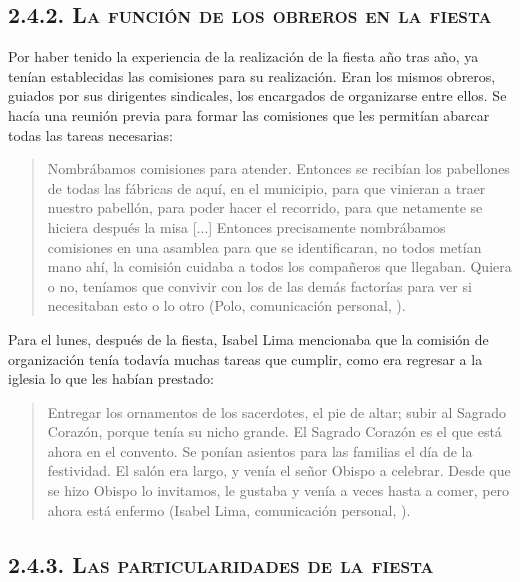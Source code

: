 \documentclass[14pt,letterpaper,twoside]{extbook} %
\begin{document}
\subsection*{\mdseries\large\textsc{2.4.2. La función de los obreros en la fiesta}}

\noindent Por haber tenido la experiencia de la realización de la fiesta año tras año, ya tenían establecidas las comisiones para su realización. Eran los mismos obreros, guiados por sus dirigentes sindicales, los encargados de organizarse entre ellos. Se hacía una reunión previa para formar las comisiones que les permitían abarcar todas las tareas necesarias:

\begin{quotation}
\noindent Nombrábamos comisiones para atender. Entonces se recibían los pabellones de todas las fábricas de aquí, en el municipio, para que vinieran a traer nuestro pabellón, para poder hacer el recorrido, para que netamente se hiciera después la misa [...] Entonces precisamente nombrábamos comisiones en una asamblea para que se identificaran, no todos metían mano ahí, la comisión cuidaba a todos los compañeros que llegaban. Quiera o no, teníamos que convivir con los de las demás factorías para ver si necesitaban esto o lo otro (Polo, comunicación personal, ).
\end{quotation}

\noindent Para el lunes, después de la fiesta, Isabel Lima mencionaba que la comisión de organización tenía todavía muchas tareas que cumplir, como era regresar a la iglesia lo que les habían prestado:

\begin{quotation}
\noindent Entregar los ornamentos de los sacerdotes, el pie de altar; subir al Sagrado Corazón, porque tenía su nicho grande. El Sagrado Corazón es el que está ahora en el convento. Se ponían asientos para las familias el día de la festividad. El salón era largo, y venía el señor Obispo a celebrar. Desde que se hizo Obispo lo invitamos, le gustaba y venía a veces hasta a comer, pero ahora está enfermo (Isabel Lima, comunicación personal, ).
\end{quotation}

\subsection*{\mdseries\large\textsc{2.4.3. Las particularidades de la fiesta}}
\end{document}
